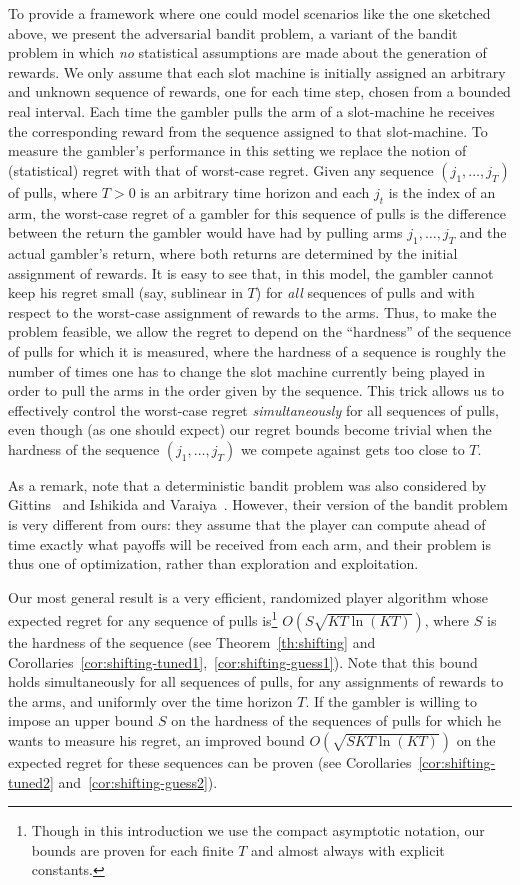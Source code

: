 \documentclass[12pt]{article}
\begin{document}
To provide a framework where one could model scenarios like the one sketched above,
we present the adversarial bandit problem,
a variant of the bandit problem in which {\em no} statistical assumptions are
made about the generation of rewards. We only assume that each slot machine
is initially assigned an arbitrary and unknown sequence of rewards, one for each
time step, chosen from a bounded real interval. Each time the gambler pulls the arm of
a slot-machine he receives the corresponding reward from the sequence assigned to
that slot-machine. To measure the gambler's performance in this setting we replace
the notion of (statistical) regret with that of worst-case regret.
Given any sequence $(j_1,\ldots,j_T)$ of pulls, where $T>0$ is an arbitrary time
horizon and each $j_t$ is the index of an arm, the worst-case regret of a gambler
for this sequence of pulls is the difference between the return the gambler
would have had by pulling arms $j_1,\ldots,j_T$ and the actual gambler's return, where
both returns are determined by the initial assignment of rewards.
It is easy to see that, in this model, the gambler cannot keep his regret small
(say, sublinear in $T$) for {\em all} sequences of pulls and with respect to the
worst-case assignment of rewards to the arms. Thus, to make the problem feasible,
we allow the regret to depend on the ``hardness'' of the sequence of pulls for
which it is measured, where the hardness of a sequence is roughly the number of times
one has to change the slot machine currently being played in order to pull the arms
in the order given by the sequence. This trick allows us to effectively control the
worst-case regret {\em simultaneously} for all sequences of pulls, even though
(as one should expect) our regret bounds become trivial when the hardness of
the sequence $(j_1,\ldots,j_T)$ we compete against gets too close to $T$.

As a remark, note that a deterministic bandit problem was also considered
by Gittins~\cite{Gittins89} and Ishikida and Varaiya~\cite{IshikidaVa94}.
However, their version of the bandit problem is very different from
ours: they assume that the player can compute ahead of time exactly what
payoffs will be received from each arm, and their problem is thus one of
optimization, rather than exploration and exploitation.

Our most general result is a very efficient, randomized player algorithm whose expected
regret for any sequence of pulls is\footnote{Though in this introduction
we use the compact asymptotic notation, our bounds are proven for each
finite $T$ and almost always with explicit constants.}
$O(S\sqrt{KT\ln(KT)})$,
where $S$ is the hardness of the sequence (see Theorem~\ref{th:shifting} and
Corollaries~\ref{cor:shifting-tuned1},~\ref{cor:shifting-guess1}).
Note that this bound holds simultaneously for all sequences
of pulls, for any assignments of rewards to the arms, and uniformly
over the time horizon $T$. If the gambler
is willing to impose an upper bound $S$ on the hardness of the sequences
of pulls for which he wants to measure his regret, an improved bound
$O(\sqrt{SKT\ln(KT)})$ on the expected regret for these sequences
can be proven (see Corollaries~\ref{cor:shifting-tuned2}
and~\ref{cor:shifting-guess2}).
\end{document}
